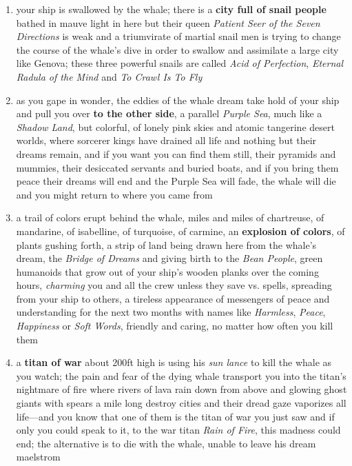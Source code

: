 \documentclass[11pt]{bxart}
\begin{document}
\begin{enumerate}
\item your ship is swallowed by the whale; there is a \textbf{city full of snail people} bathed in mauve light in here but their queen \textit{Patient Seer of the Seven Directions} is weak and a triumvirate of martial snail men is trying to change the course of the whale's dive in order to swallow and assimilate a large city like Genova; these three powerful snails are called \textit{Acid of Perfection}, \textit{Eternal Radula of the Mind} and \textit{To Crawl Is To Fly}


\item as you gape in wonder, the eddies of the whale dream take hold of your ship and pull you over \textbf{to the other side}, a parallel \textit{Purple Sea}, much like a \textit{Shadow Land}, but colorful, of lonely pink skies and atomic tangerine desert worlds, where sorcerer kings have drained all life and nothing but their dreams remain, and if you want you can find them still, their pyramids and mummies, their desiccated servants and buried boats, and if you bring them peace their dreams will end and the Purple Sea will fade, the whale will die and you might return to where you came from

\item a trail of colors erupt behind the whale, miles and miles of chartreuse, of mandarine, of isabelline, of turquoise, of carmine, an \textbf{explosion of colors}, of plants gushing forth, a strip of land being drawn here from the whale's dream, the \textit{Bridge of Dreams} and giving birth to the \textit{Bean People}, green humanoids that grow out of your ship's wooden planks over the coming hours, \textit{charming} you and all the crew unless they save vs. spells, spreading from your ship to others, a tireless appearance of messengers of peace and understanding for the next two months with names like \textit{Harmless}, \textit{Peace}, \textit{Happiness} or \textit{Soft Words}, friendly and caring, no matter how often you kill them

\item a \textbf{titan of war} about 200ft high is using his \textit{sun lance} to kill the whale as you watch; the pain and fear of the dying whale transport you into the titan's nightmare of fire where rivers of lava rain down from above and glowing ghost giants with spears a mile long destroy cities and their dread gaze vaporizes all life—and you know that one of them is the titan of war you just saw and if only you could speak to it, to the war titan \textit{Rain of Fire}, this madness could end; the alternative is to die with the whale, unable to leave his dream maelstrom


\end{enumerate}
\end{document}
